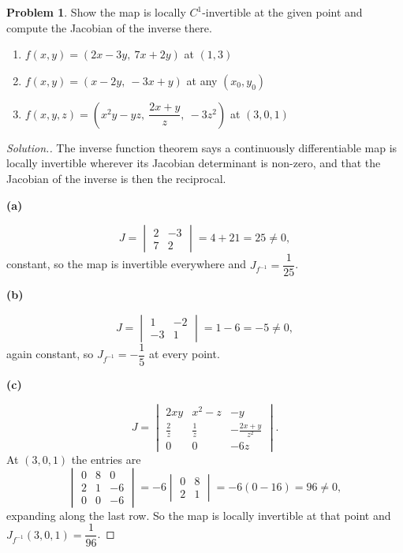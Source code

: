 \documentclass[11pt,a4paper]{article}
\theoremstyle{definition}
\newtheorem{problemx}{Problem}[subsection]
\newenvironment{problem}{\begin{problemx}}{\end{problemx}}
\newenvironment{solution}
  {\renewcommand{\qedsymbol}{}\begin{proof}[\textit{Solution}.]}
  {\end{proof}}
\newcommand{\subhead}[1]{%
  \par\medskip\noindent\textbf{#1}\par\nobreak\smallskip}
\begin{document}
\begin{problem}
Show the map is locally $C^1$-invertible at the given point and compute the
Jacobian of the inverse there.
\begin{enumerate}
\item[(a)] $f(x,y) = (2x-3y,\ 7x+2y)$ at $(1,3)$
\item[(b)] $f(x,y) = (x-2y,\ -3x+y)$ at any $(x_0,y_0)$
\item[(c)] $f(x,y,z) = \left(x^2y-yz,\ \dfrac{2x+y}{z},\ -3z^2\right)$ at $(3,0,1)$
\end{enumerate}
\end{problem}
\begin{solution}
The inverse function theorem says a continuously differentiable map is locally
invertible wherever its Jacobian determinant is non-zero, and that the Jacobian
of the inverse is then the reciprocal.

\subhead{(a)}
\[J = \begin{vmatrix}2 & -3\\ 7 & 2\end{vmatrix} = 4+21 = 25 \neq 0 ,\]
constant, so the map is invertible everywhere and
$J_{f^{-1}} = \dfrac{1}{25}$.

\subhead{(b)}
\[J = \begin{vmatrix}1 & -2\\ -3 & 1\end{vmatrix} = 1-6 = -5\neq 0 ,\]
again constant, so $J_{f^{-1}} = -\dfrac15$ at every point.

\subhead{(c)}
\[J = \begin{vmatrix}
2xy & x^2-z & -y\\
\frac{2}{z} & \frac{1}{z} & -\frac{2x+y}{z^2}\\
0 & 0 & -6z
\end{vmatrix}.\]
At $(3,0,1)$ the entries are
\[\begin{vmatrix}
0 & 8 & 0\\
2 & 1 & -6\\
0 & 0 & -6
\end{vmatrix}
= -6\begin{vmatrix}0 & 8\\ 2 & 1\end{vmatrix} = -6(0-16) = 96 \neq 0 ,\]
expanding along the last row. So the map is locally invertible at that point and
$J_{f^{-1}}(3,0,1) = \dfrac{1}{96}$.
\end{solution}
\end{document}
